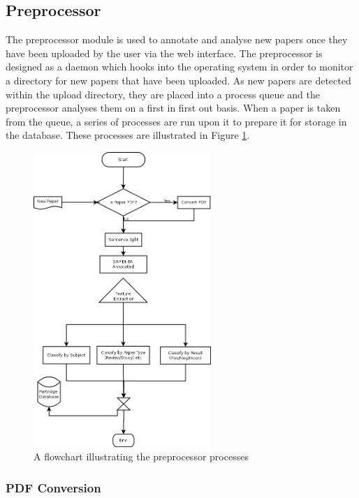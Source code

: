 \subsection{ Preprocessor }

The preprocessor module is used to annotate and analyse new papers once they
have been uploaded by the user via the web interface. The preprocessor is
designed as a daemon which hooks into the operating system in order to monitor
a directory for new papers that have been uploaded. As new papers are detected
within the upload directory, they are placed into a process queue and the
preprocessor analyses them on a first in first out basis. When a paper is taken
from the queue, a series of processes are run upon it to prepare it for storage
in the database. These processes are illustrated in Figure
\ref{fig:flow_preprocessor}.

\begin{figure}[!h]
\centering
\includegraphics[width=0.6\textwidth]{images/design/flow_preprocessor.png}
\caption{A flowchart illustrating the preprocessor processes}
\label{fig:flow_preprocessor}
\end{figure}

\subsubsection{PDF Conversion}

